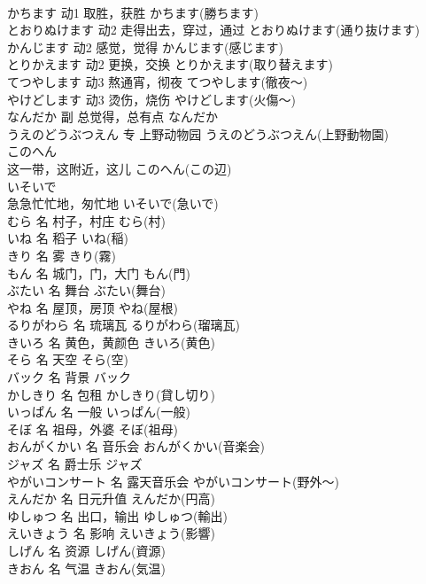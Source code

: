 \documentclass[8pt]{extreport}
\begin{document}
\begin{CJK}{UTF8}{min}
\\	かちます	动1	取胜，获胜	かちます(勝ちます)	
\\	とおりぬけます	动2	走得出去，穿过，通过	とおりぬけます(通り抜けます)	
\\	かんじます	动2	感觉，觉得	かんじます(感じます)	
\\	とりかえます	动2	更换，交换	とりかえます(取り替えます)	
\\	てつやします	动3	熬通宵，彻夜	てつやします(徹夜～)	
\\	やけどします	动3	烫伤，烧伤	やけどします(火傷～)	
\\	なんだか	副	总觉得，总有点	なんだか	
\\	うえのどうぶつえん	专	上野动物园	うえのどうぶつえん(上野動物園)	
\\	このへん	
\\	这一带，这附近，这儿	このへん(この辺)	
\\	いそいで	
\\	急急忙忙地，匆忙地	いそいで(急いで)	
\\	むら	名	村子，村庄	むら(村)	
\\	いね	名	稻子	いね(稲)	
\\	きり	名	雾	きり(霧)	
\\	もん	名	城门，门，大门	もん(門)	
\\	ぶたい	名	舞台	ぶたい(舞台)	
\\	やね	名	屋顶，房顶	やね(屋根)	
\\	るりがわら	名	琉璃瓦	るりがわら(瑠璃瓦)	
\\	きいろ	名	黄色，黄颜色	きいろ(黄色)	
\\	そら	名	天空	そら(空)	
\\	バック	名	背景	バック	
\\	かしきり	名	包租	かしきり(貸し切り)	
\\	いっぱん	名	一般	いっぱん(一般)	
\\	そぼ	名	祖母，外婆	そぼ(祖母)	
\\	おんがくかい	名	音乐会	おんがくかい(音楽会)	
\\	ジャズ	名	爵士乐	ジャズ	
\\	やがいコンサート	名	露天音乐会	やがいコンサート(野外～)	
\\	えんだか	名	日元升值	えんだか(円高)	
\\	ゆしゅつ	名	出口，输出	ゆしゅつ(輸出)	
\\	えいきょう	名	影响	えいきょう(影響)	
\\	しげん	名	资源	しげん(資源)	
\\	きおん	名	气温	きおん(気温)	

\end{CJK}
\end{document}
